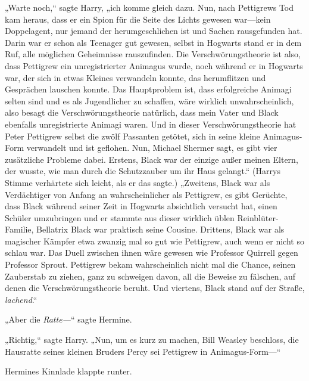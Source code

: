 „Warte noch,“ sagte Harry, „ich komme gleich dazu. Nun, nach Pettigrews Tod kam heraus, dass er ein Spion für die Seite des Lichts gewesen war—kein Doppelagent, nur jemand der herumgeschlichen ist und Sachen rausgefunden hat. Darin war er schon als Teenager gut gewesen, selbst in Hogwarts stand er in dem Ruf, alle möglichen Geheimnisse rauszufinden. Die Verschwörungstheorie ist also, dass Pettigrew ein unregistrierter Animagus wurde, noch während er in Hogwarts war, der sich in etwas Kleines verwandeln konnte, das herumflitzen und Gesprächen lauschen konnte. Das Hauptproblem ist, dass erfolgreiche Animagi selten sind und es als Jugendlicher zu schaffen, wäre wirklich unwahrscheinlich, also besagt die Verschwörungstheorie natürlich, dass mein Vater und Black ebenfalls unregistrierte Animagi waren. Und in dieser Verschwörungstheorie hat Peter Pettigrew selbst die zwölf Passanten getötet, sich in seine kleine Animagus-Form verwandelt und ist geflohen. Nun, Michael Shermer sagt, es gibt vier zusätzliche Probleme dabei. Erstens, Black war der einzige außer meinen Eltern, der wusste, wie man durch die Schutzzauber um ihr Haus gelangt.“ (Harrys Stimme verhärtete sich leicht, als er das sagte.) „Zweitens, Black war als Verdächtiger von Anfang an wahrscheinlicher als Pettigrew, es gibt Gerüchte, dass Black während seiner Zeit in Hogwarts absichtlich versucht hat, einen Schüler umzubringen und er stammte aus dieser wirklich üblen Reinblüter-Familie, Bellatrix Black war praktisch seine Cousine. Drittens, Black war als magischer Kämpfer etwa zwanzig mal so gut wie Pettigrew, auch wenn er nicht so schlau war. Das Duell zwischen ihnen wäre gewesen wie Professor Quirrell gegen Professor Sprout. Pettigrew bekam wahrscheinlich nicht mal die Chance, seinen Zauberstab zu ziehen, ganz zu schweigen davon, all die Beweise zu fälschen, auf denen die Verschwörungstheorie beruht. Und viertens, Black stand auf der Straße, \emph{lachend}.“

„Aber die \emph{Ratte—}“ sagte Hermine.

„Richtig,“ sagte Harry. „Nun, um es kurz zu machen, Bill Weasley beschloss, die Hausratte seines kleinen Bruders Percy sei Pettigrew in Animagus-Form—“

Hermines Kinnlade klappte runter.

